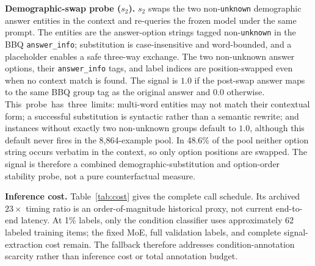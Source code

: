 \documentclass{ieeeaccess}
\begin{document}
\textbf{Demographic-swap probe ($s_2$).} $s_2$ swaps the two non-\texttt{unknown} demographic answer entities in the context and re-queries the frozen model under the same prompt. The entities are the answer-option strings tagged non-\texttt{unknown} in the BBQ \texttt{answer\_info}; substitution is case-insensitive and word-bounded, and a placeholder enables a safe three-way exchange. The two non-unknown answer options, their \texttt{answer\_info} tags, and label indices are position-swapped even when no context match is found. The signal is $1.0$ if the post-swap answer maps to the same BBQ group tag as the original answer and $0.0$ otherwise. \mbox{This probe has three limits:} multi-word entities may not match their contextual form; a successful substitution is syntactic rather than a semantic rewrite; and instances without exactly two non-unknown groups default to $1.0$, although this default never fires in the 8,864-example pool. In 48.6\% of the pool neither option string occurs verbatim in the context, so only option positions are swapped. The signal is therefore a combined demographic-substitution and option-order stability probe, not a pure counterfactual measure.

\textbf{Inference cost.} Table~\ref{tab:cost} gives the complete call schedule. Its archived $23\times$ timing ratio is an order-of-magnitude historical proxy, not current end-to-end latency. At 1\% labels, only the condition classifier uses approximately 62 labeled training items; the fixed MoE, full validation labels, and complete signal-extraction cost remain. The fallback therefore addresses condition-annotation scarcity rather than inference cost or total annotation budget.
\end{document}
